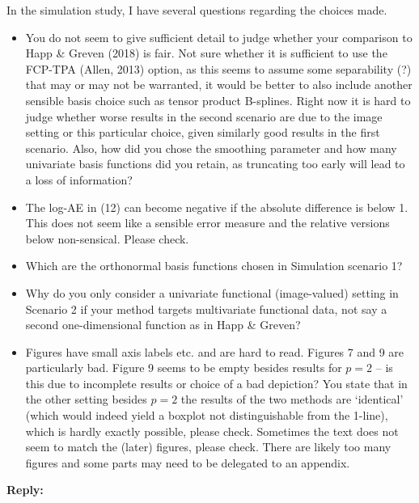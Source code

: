 \documentclass[11pt]{article}
\begin{document}
In the simulation study, I have several questions regarding the choices made.
\begin{itemize}
  \item You do not seem to give sufficient detail to judge whether your comparison to Happ \& Greven (2018) is fair. Not sure whether it is sufficient to use the FCP-TPA (Allen, 2013) option, as this seems to assume some separability (?) that may or may not be warranted, it would be better to also include another sensible basis choice such as tensor product B-splines. Right now it is hard to judge whether worse results in the second scenario are due to the image setting or this particular choice, given similarly good results in the first scenario. Also, how did you chose the smoothing parameter and how many univariate basis functions did you retain, as truncating too early will lead to a loss of information?
  \item The log-AE in (12) can become negative if the absolute difference is below 1. This does not seem like a sensible error measure and the relative versions below non-sensical. Please check.
  \item Which are the orthonormal basis functions chosen in Simulation scenario 1?
  \item Why do you only consider a univariate functional (image-valued) setting in Scenario 2 if your method targets multivariate functional data, not say a second one-dimensional function as in Happ \& Greven?
  \item Figures have small axis labels etc. and are hard to read. Figures 7 and 9 are particularly bad. Figure 9 seems to be empty besides results for $p=2$ – is this due to incomplete results or choice of a bad depiction? You state that in the other setting besides $p=2$ the results of the two methods are ‘identical’ (which would indeed yield a boxplot not distinguishable from the 1-line), which is hardly exactly possible, please check. Sometimes the text does not seem to match the (later) figures, please check. There are likely too many figures and some parts may need to be delegated to an appendix.
\end{itemize}


\medskip

\normalfont

\textbf{Reply:}
\end{document}
